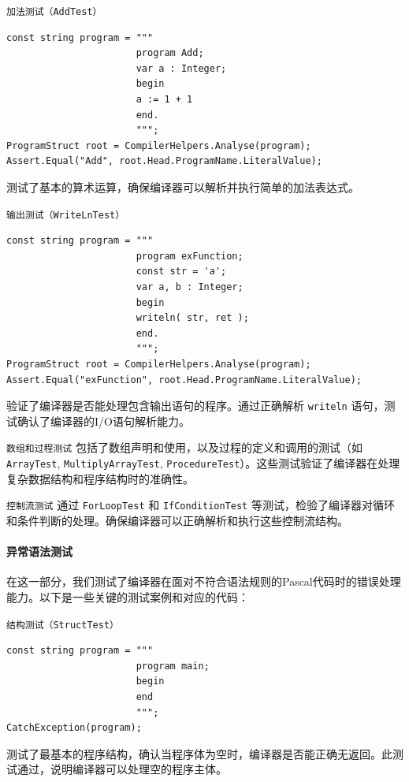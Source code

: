 \documentclass[../main.tex]{subfiles}
\begin{document}
\texttt{加法测试（AddTest）}
\begin{lstlisting}[style=csharp]
const string program = """
                       program Add;
                       var a : Integer;
                       begin
                       a := 1 + 1
                       end.
                       """;
ProgramStruct root = CompilerHelpers.Analyse(program);
Assert.Equal("Add", root.Head.ProgramName.LiteralValue);
\end{lstlisting}
测试了基本的算术运算，确保编译器可以解析并执行简单的加法表达式。

\texttt{输出测试（WriteLnTest）}
\begin{lstlisting}[style=csharp]
const string program = """
                       program exFunction;
                       const str = 'a';
                       var a, b : Integer;
                       begin
                       writeln( str, ret );
                       end.
                       """;
ProgramStruct root = CompilerHelpers.Analyse(program);
Assert.Equal("exFunction", root.Head.ProgramName.LiteralValue);
\end{lstlisting}
验证了编译器是否能处理包含输出语句的程序。通过正确解析 \texttt{writeln} 语句，测试确认了编译器的I/O语句解析能力。

\texttt{数组和过程测试}
包括了数组声明和使用，以及过程的定义和调用的测试（如 \texttt{ArrayTest}, \texttt{MultiplyArrayTest}, \texttt{ProcedureTest}）。这些测试验证了编译器在处理复杂数据结构和程序结构时的准确性。

\texttt{控制流测试}
通过 \texttt{ForLoopTest} 和 \texttt{IfConditionTest} 等测试，检验了编译器对循环和条件判断的处理。确保编译器可以正确解析和执行这些控制流结构。

\paragraph{异常语法测试}
在这一部分，我们测试了编译器在面对不符合语法规则的Pascal代码时的错误处理能力。以下是一些关键的测试案例和对应的代码：

\texttt{结构测试（StructTest）}
\begin{lstlisting}[style=csharp]
const string program = """
                       program main;
                       begin
                       end
                       """;
CatchException(program);
\end{lstlisting}
测试了最基本的程序结构，确认当程序体为空时，编译器是否能正确无返回。此测试通过，说明编译器可以处理空的程序主体。
\end{document}

